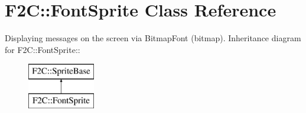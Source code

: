 \hypertarget{class_f2_c_1_1_font_sprite}{
\section{F2C::FontSprite Class Reference}
\label{class_f2_c_1_1_font_sprite}
}


Displaying messages on the screen via BitmapFont (bitmap).  
Inheritance diagram for F2C::FontSprite::\begin{figure}[H]
\begin{center}
\leavevmode
\includegraphics[height=2cm]{class_f2_c_1_1_font_sprite}
\end{center}
\end{figure}
